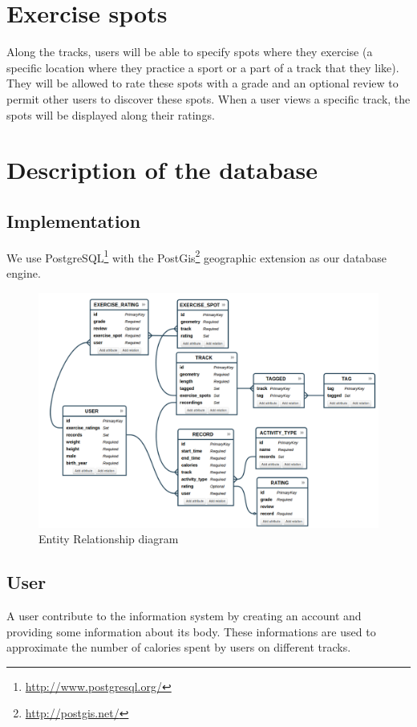 \documentclass[a4paper]{article}
\begin{document}
\section{Exercise spots}

Along the tracks, users will be able to specify spots where they exercise (a specific location where they practice a sport or a part of a track that they like). They will be allowed to rate these spots with a grade and an optional review to permit other users to discover these spots.
When a user views a specific track, the spots will be displayed along their ratings.

\section{Description of the database}

\subsection{Implementation}
We use PostgreSQL\footnote{\url{http://www.postgresql.org/}} with the PostGis\footnote{\url{http://postgis.net/}} geographic extension as our database engine.

\begin{figure}[h]
    \includegraphics[width=\textwidth]{er-diagram.png}
    \caption{Entity Relationship diagram}
\end{figure}


\subsection{User}
A user contribute to the information system by creating an account and providing
some information about its body. These informations are used to approximate the
number of calories spent by users on different tracks.
\end{document}
